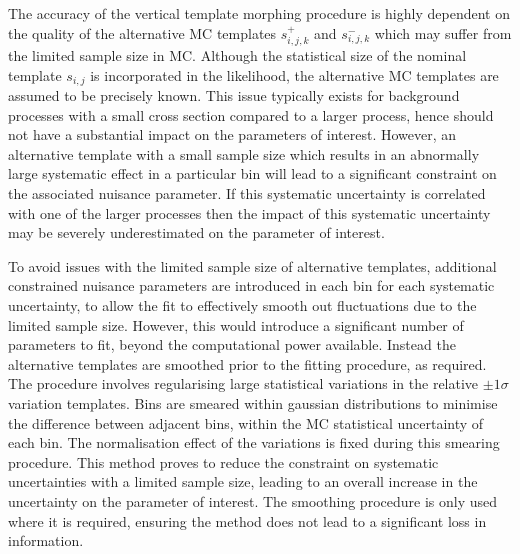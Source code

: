The accuracy of the vertical template morphing procedure is highly dependent on the quality of the alternative MC templates $s_{i,j,k}^+$ and $s_{i,j,k}^-$ which may suffer from the limited sample size in MC. Although the statistical size of the nominal template $s_{i,j}$ is incorporated in the likelihood, the alternative MC templates are assumed to be precisely known. This issue typically exists for background processes with a small cross section compared to a larger process, hence should not have a substantial impact on the parameters of interest. However, an alternative template with a small sample size which results in an abnormally large systematic effect in a particular bin will lead to a significant constraint on the associated nuisance parameter. If this systematic uncertainty is correlated with one of the larger processes then the impact of this systematic uncertainty may be severely underestimated on the parameter of interest.

To avoid issues with the limited sample size of alternative templates, additional constrained nuisance parameters are introduced in each bin for each systematic uncertainty, to allow the fit to effectively smooth out fluctuations due to the limited sample size. However, this would introduce a significant number of parameters to fit, beyond the computational power available. Instead the alternative templates are smoothed prior to the fitting procedure, as required. The procedure involves regularising large statistical variations in the relative $\pm 1\sigma$ variation templates. Bins are smeared within gaussian distributions to minimise the difference between adjacent bins, within the MC statistical uncertainty of each bin. The normalisation effect of the variations is fixed during this smearing procedure. This method proves to reduce the constraint on systematic uncertainties with a limited sample size, leading to an overall increase in the uncertainty on the parameter of interest. The smoothing procedure is only used where it is required, ensuring the method does not lead to a significant loss in information.

